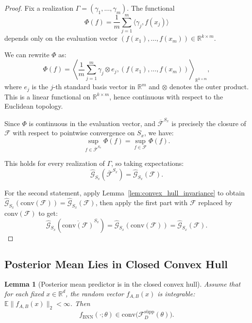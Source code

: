 \documentclass{article}
\theoremstyle{plain}
\newtheorem{lemma}[theorem]{Lemma}
\theoremstyle{definition}
\theoremstyle{remark}
\begin{document}
\begin{proof}
Fix a realization $\Gamma=(\gamma_1,\ldots,\gamma_m)$. The functional
\[
\Phi(f) = \frac{1}{m}\sum_{j=1}^m \langle\gamma_j, f(x_j)\rangle
\]
depends only on the evaluation vector $(f(x_1),\ldots,f(x_m))\in\mathbb{R}^{k\times m}$.

We can rewrite $\Phi$ as:
\[
\Phi(f) = \left\langle \frac{1}{m}\sum_{j=1}^m \gamma_j \otimes e_j, (f(x_1),\ldots,f(x_m))\right\rangle_{\mathbb{R}^{k\times m}},
\]
where $e_j$ is the $j$-th standard basis vector in $\mathbb{R}^m$ and $\otimes$ denotes the outer product. This is a linear functional on $\mathbb{R}^{k\times m}$, hence continuous with respect to the Euclidean topology.

Since $\Phi$ is continuous in the evaluation vector, and $\overline{\mathcal{F}}^{S_x}$ is precisely the closure of $\mathcal{F}$ with respect to pointwise convergence on $S_x$, we have:
\[
\sup_{f\in\overline{\mathcal{F}}^{S_x}}\Phi(f) = \sup_{f\in\mathcal{F}}\Phi(f).
\]

This holds for every realization of $\Gamma$, so taking expectations:
\[
\hat{\mathcal{G}}_{S_x}(\overline{\mathcal{F}}^{S_x}) = \hat{\mathcal{G}}_{S_x}(\mathcal{F}).
\]

For the second statement, apply Lemma~\ref{lem:convex_hull_invariance} to obtain $\hat{\mathcal{G}}_{S_x}(\mathrm{conv}(\mathcal{F}))=\hat{\mathcal{G}}_{S_x}(\mathcal{F})$, then apply the first part with $\mathcal{F}$ replaced by $\mathrm{conv}(\mathcal{F})$ to get:
\[
\hat{\mathcal{G}}_{S_x}(\overline{\mathrm{conv}(\mathcal{F})}^{S_x})
= \hat{\mathcal{G}}_{S_x}(\mathrm{conv}(\mathcal{F}))
= \hat{\mathcal{G}}_{S_x}(\mathcal{F}).
\]
\end{proof}

\subsection{Posterior Mean Lies in Closed Convex Hull}\label{app:gaussian_complexity:convex_hull_bnn}

\begin{lemma}[Posterior mean predictor is in the closed convex hull]
\label{lem:bnn_in_closed_conv}
Assume that for each fixed $x\in\mathbb{R}^d$, the random vector $f_{A,B}(x)$ is integrable: $\mathbb{E}\|f_{A,B}(x)\|_2<\infty$. Then
\[
f_{\mathrm{BNN}}(\cdot;\theta) \in \overline{\mathrm{conv}\big(\mathcal{F}^{\mathrm{supp}}_D(\theta)\big)}.
\]
\end{lemma}
\end{document}
